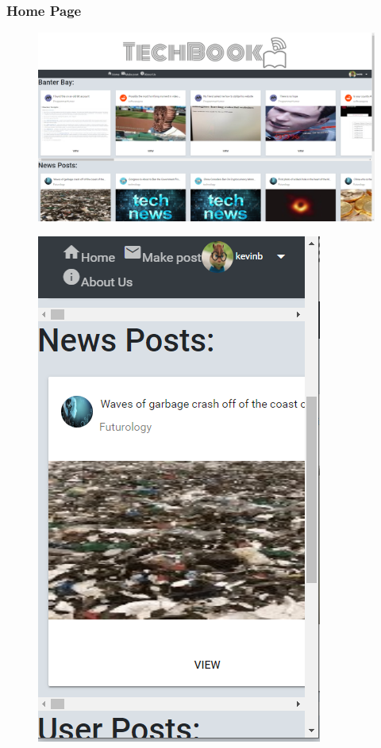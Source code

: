 \subsubsection{Home Page}

\begin{figure}[H]
\centering
\begin{minipage}{.75\textwidth}
  \centering
  \includegraphics[width=.9\linewidth]{img/ui/homepcsnap.PNG}
  \label{fig:test1}
\end{minipage}%
\begin{minipage}{.25\textwidth}
  \centering
  \includegraphics[width=.9\linewidth]{img/ui/homemobile.PNG}

\end{minipage}
\end{figure}
